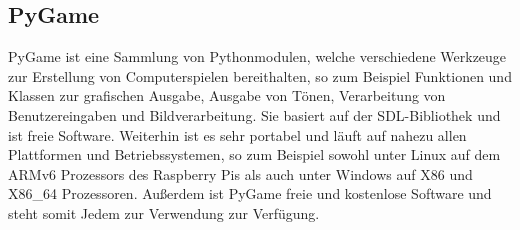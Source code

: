\documentclass[hidelinks]{article}
\begin{document}
\subsection{PyGame}
PyGame ist eine Sammlung von Pythonmodulen, welche verschiedene Werkzeuge zur Erstellung von Computerspielen bereithalten, so zum Beispiel Funktionen und Klassen zur grafischen Ausgabe, Ausgabe von Tönen, Verarbeitung von Benutzereingaben und Bildverarbeitung. Sie basiert auf der SDL-Bibliothek und ist freie Software. Weiterhin ist es sehr portabel und läuft auf nahezu allen Plattformen und Betriebssystemen, so zum Beispiel sowohl unter Linux auf dem ARMv6 Prozessors des Raspberry Pis als auch unter Windows auf X86 und X86\_64 Prozessoren. Außerdem ist PyGame freie und kostenlose Software und steht somit Jedem zur Verwendung zur Verfügung.
\end{document}
